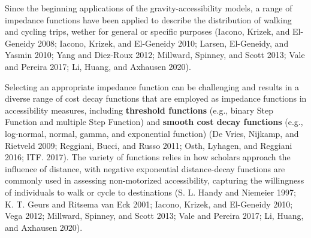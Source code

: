 \documentclass[preprint, 3p,
authoryear]{elsarticle} %
\begin{document}
Since the beginning applications of the gravity-accessibility models, a
range of impedance functions have been applied to describe the
distribution of walking and cycling trips, wether for general or
specific purposes (Iacono, Krizek, and El-Geneidy 2008; Iacono, Krizek,
and El-Geneidy 2010; Larsen, El-Geneidy, and Yasmin 2010; Yang and
Diez-Roux 2012; Millward, Spinney, and Scott 2013; Vale and Pereira
2017; Li, Huang, and Axhausen 2020).

Selecting an appropriate impedance function can be challenging and
results in a diverse range of cost decay functions that are employed as
impedance functions in accessibility measures, including
\textbf{threshold functions} (e.g., binary Step Function and multiple
Step Function) and \textbf{smooth cost decay functions} (e.g.,
log-normal, normal, gamma, and exponential function) (De Vries, Nijkamp,
and Rietveld 2009; Reggiani, Bucci, and Russo 2011; Osth, Lyhagen, and
Reggiani 2016; ITF. 2017). The variety of functions relies in how
scholars approach the influence of distance, with negative exponential
distance-decay functions are commonly used in assessing non-motorized
accessibility, capturing the willingness of individuals to walk or cycle
to destinations (S. L. Handy and Niemeier 1997; K. T. Geurs and Ritsema
van Eck 2001; Iacono, Krizek, and El-Geneidy 2010; Vega 2012; Millward,
Spinney, and Scott 2013; Vale and Pereira 2017; Li, Huang, and Axhausen
2020).
\end{document}
